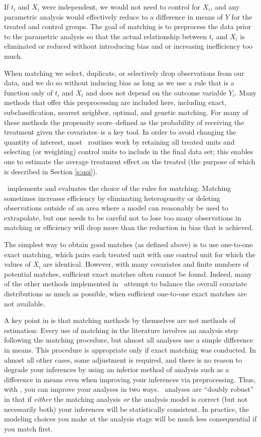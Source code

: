 If $t_i$ and $X_i$ were independent, we would not need to control for
$X_i$, and any parametric analysis would effectively reduce to a
difference in means of $Y$ for the treated and control groups.  The
goal of matching is to preprocess the data prior to the parametric
analysis so that the actual relationship between $t_i$ and $X_i$ is
eliminated or reduced without introducing bias and or increasing
inefficiency too much.  

When matching we select, duplicate, or selectively drop observations
from our data, and we do so without inducing bias as long as we use a
rule that is a function only of $t_i$ and $X_i$ and does not depend on
the outcome variable $Y_i$.  Many methods that offer this
preprocessing are included here, including exact, subclassification,
nearest neighbor, optimal, and genetic
matching.  For many of these methods the propensity score--defined as the
probability of receiving the treatment given the covariates--is a key tool.
In order to avoid changing the quantity of interest, most
\MatchIt\ routines work by retaining all treated units and selecting (or weighting)
control units to include in the final data set; this enables
one to estimate the average treatment effect on the treated (the purpose
of which is described in Section \ref{s:qoi}).

\MatchIt\ implements and evaluates the choice of the rules for
matching.  Matching sometimes increases efficiency by eliminating
heterogeneity or deleting observations outside of an area where a
model can reasonably be used to extrapolate, but one needs to be
careful not to lose too many observations in matching or efficiency
will drop more than the reduction in bias that is achieved.

The simplest way to obtain good matches (as defined above) is to use
one-to-one exact matching, which pairs each treated unit with one
control unit for which the values of $X_i$ are identical.  However,
with many covariates and finite numbers of potential matches, 
sufficient exact matches often cannot be found.  Indeed, many of the
other methods implemented in \MatchIt\ attempt to balance the overall
covariate distributions as much as possible, when sufficient
one-to-one exact matches are not available.

A key point in \citet*{HoImaKin07} is that matching methods by
themselves are not methods of estimation: Every use of matching in the
literature involves an analysis step following the matching procedure,
but almost all analyses use a simple difference in means.  This
procedure is appropriate only if exact matching was conducted.  In
almost all other cases, some adjustment is required, and there is no
reason to degrade your inferences by using an inferior method of
analysis such as a difference in means even when improving your
inferences via preprocessing.  Thus, with \MatchIt, you can improve
your analyses in two ways. \MatchIt\ analyses are ``doubly
robust'' in that if \emph{either} the matching analysis \emph{or} the
analysis model is correct (but not necessarily both) your inferences
will be statistically consistent.  In practice, the modeling choices
you make at the analysis stage will be much less consequential if you
match first.

